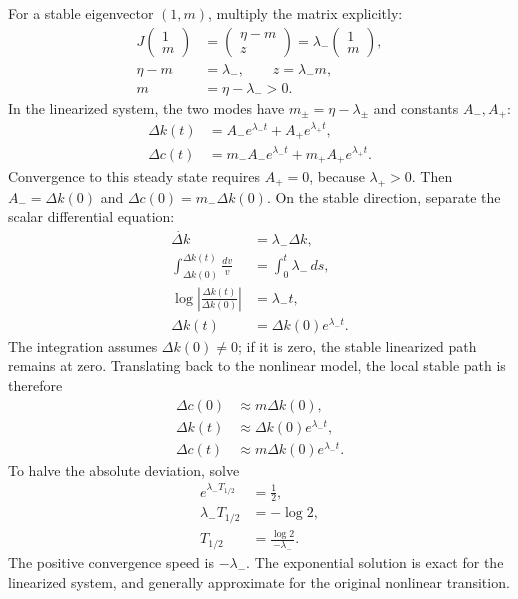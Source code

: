 For a stable eigenvector $(1,m)$, multiply the matrix explicitly:
\begin{align}
J\begin{pmatrix}1\\m\end{pmatrix}
 &=\begin{pmatrix}\eta-m\\z\end{pmatrix}
  =\lambda_-\begin{pmatrix}1\\m\end{pmatrix},\\
\eta-m&=\lambda_-,\qquad z=\lambda_-m,\\
m&=\eta-\lambda_->0.
\end{align}
In the linearized system, the two modes have
$m_\pm=\eta-\lambda_\pm$ and constants $A_-,A_+$:
\begin{align}
\Delta k(t)&=A_-e^{\lambda_-t}+A_+e^{\lambda_+t},\\
\Delta c(t)&=m_-A_-e^{\lambda_-t}+m_+A_+e^{\lambda_+t}.
\end{align}
Convergence to this steady state requires $A_+=0$, because $\lambda_+>0$.
Then $A_-=\Delta k(0)$ and $\Delta c(0)=m_-\Delta k(0)$.
On the stable direction, separate the scalar differential equation:
\begin{align}
\dot{\Delta k}&=\lambda_-\Delta k,\\
\int_{\Delta k(0)}^{\Delta k(t)}\frac{dv}{v}
 &=\int_0^t\lambda_-\,ds,\\
\log\left|\frac{\Delta k(t)}{\Delta k(0)}\right|&=\lambda_-t,\\
\Delta k(t)&=\Delta k(0)e^{\lambda_-t}.
\end{align}
The integration assumes $\Delta k(0)\ne0$; if it is zero, the stable
linearized path remains at zero. Translating back to the nonlinear model,
the local stable path is therefore
\begin{align}
\Delta c(0)&\approx m\Delta k(0),\\
\Delta k(t)&\approx\Delta k(0)e^{\lambda_-t},\\
\Delta c(t)&\approx m\Delta k(0)e^{\lambda_-t}.
\end{align}
To halve the absolute deviation, solve
\begin{align}
e^{\lambda_-T_{1/2}}&=\tfrac12,\\
\lambda_-T_{1/2}&=-\log2,\\
T_{1/2}&=\frac{\log2}{-\lambda_-}.
\end{align}
The positive convergence speed is $-\lambda_-$. The exponential solution is exact for the linearized
system, and generally approximate for the original nonlinear transition.

